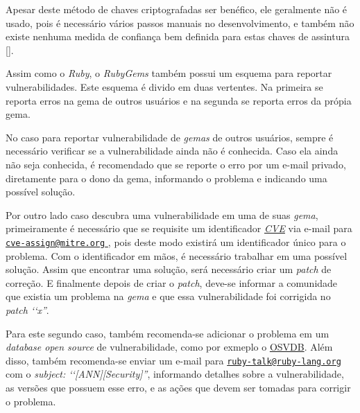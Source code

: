 Apesar deste método de chaves criptografadas ser benéfico, ele geralmente não é usado, pois é necessário
vários passos manuais no desenvolvimento, e também não existe nenhuma medida de confiança bem definida
para estas chaves de assintura [].

Assim como o \emph{Ruby}, o \emph{RubyGems} também possui um esquema para reportar vulnerabilidades.
Este esquema é divido em duas vertentes. Na primeira se reporta erros na gema de outros usuários e na
segunda se reporta erros da própia gema.

No caso para reportar vulnerabilidade de \emph{gemas} de outros usuários, sempre é necessário verificar
se a vulnerabilidade ainda não é conhecida. Caso ela ainda não seja conhecida, é recomendado que se
reporte o erro por um e-mail privado, diretamente para o dono da gema, informando o problema e
indicando uma possível solução.

Por outro lado caso descubra uma vulnerabilidade em uma de suas \emph{gema}, primeiramente
é necessário que se requisite um identificador \emph{\href{https://cve.mitre.org/}{CVE}} via e-mail para
\href{mailto:cve-assign@mitre.org}{\nolinkurl{cve-assign@mitre.org} }, pois deste modo existirá
um identificador único para o problema. Com o identificador em mãos, é necessário trabalhar em uma
possível solução. Assim que encontrar uma solução, será necessário criar um \emph{patch} de correção.
E finalmente depois de criar o \emph{patch}, deve-se informar a comunidade que existia um problema na
\emph{gema} e que essa vulnerabilidade foi corrigida no \emph{patch ‘‘x''}.

Para este segundo caso, também recomenda-se adicionar o problema em um \emph{database open source}
de vulnerabilidade, como por exmeplo o \href{http://osvdb.org/}{OSVDB}. Além disso, também recomenda-se
enviar um e-mail para \href{mailto:ruby-talk@ruby-lang.org} {\nolinkurl{ruby-talk@ruby-lang.org} } com o
\emph{subject: ‘‘[ANN][Security]''}, informando detalhes sobre a vulnerabilidade, as versões que
possuem esse erro, e as ações que devem ser tomadas para corrigir o problema.